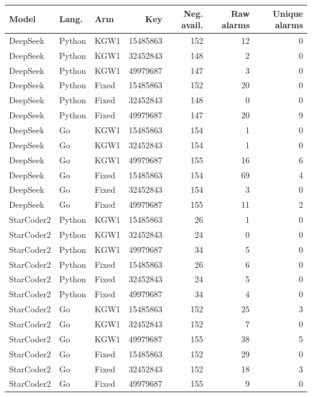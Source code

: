 \begin{tabular}{lllrrrr}
\toprule
Model & Lang. & Arm & Key & Neg. avail. & Raw alarms & Unique alarms \\
\midrule
DeepSeek & Python & KGW1 & 15485863 & 152 & 12 & 0 \\
DeepSeek & Python & KGW1 & 32452843 & 148 & 2 & 0 \\
DeepSeek & Python & KGW1 & 49979687 & 147 & 3 & 0 \\
DeepSeek & Python & Fixed & 15485863 & 152 & 20 & 0 \\
DeepSeek & Python & Fixed & 32452843 & 148 & 0 & 0 \\
DeepSeek & Python & Fixed & 49979687 & 147 & 20 & 9 \\
DeepSeek & Go & KGW1 & 15485863 & 154 & 1 & 0 \\
DeepSeek & Go & KGW1 & 32452843 & 154 & 1 & 0 \\
DeepSeek & Go & KGW1 & 49979687 & 155 & 16 & 6 \\
DeepSeek & Go & Fixed & 15485863 & 154 & 69 & 4 \\
DeepSeek & Go & Fixed & 32452843 & 154 & 3 & 0 \\
DeepSeek & Go & Fixed & 49979687 & 155 & 11 & 2 \\
StarCoder2 & Python & KGW1 & 15485863 & 26 & 1 & 0 \\
StarCoder2 & Python & KGW1 & 32452843 & 24 & 0 & 0 \\
StarCoder2 & Python & KGW1 & 49979687 & 34 & 5 & 0 \\
StarCoder2 & Python & Fixed & 15485863 & 26 & 6 & 0 \\
StarCoder2 & Python & Fixed & 32452843 & 24 & 5 & 0 \\
StarCoder2 & Python & Fixed & 49979687 & 34 & 4 & 0 \\
StarCoder2 & Go & KGW1 & 15485863 & 152 & 25 & 3 \\
StarCoder2 & Go & KGW1 & 32452843 & 152 & 7 & 0 \\
StarCoder2 & Go & KGW1 & 49979687 & 155 & 38 & 5 \\
StarCoder2 & Go & Fixed & 15485863 & 152 & 29 & 0 \\
StarCoder2 & Go & Fixed & 32452843 & 152 & 18 & 3 \\
StarCoder2 & Go & Fixed & 49979687 & 155 & 9 & 0 \\
\bottomrule
\end{tabular}
